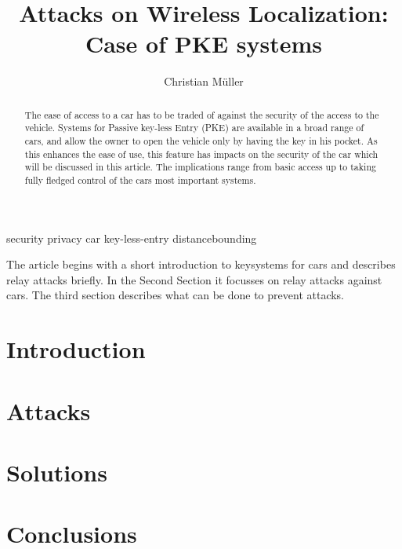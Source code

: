 \documentclass[a4paper]{IEEEtran}
\title{Attacks on Wireless Localization:\\Case of PKE systems}
\author{Christian Müller}
\begin{document}
\maketitle
\begin{IEEEkeywords}
security privacy car key-less-entry distancebounding
\end{IEEEkeywords}


\begin{abstract}
The ease of access to a car has to be traded of against the security of the
access to the vehicle.
Systems for Passive key-less Entry (PKE) are available in a broad range of cars,
and allow the owner to open the vehicle only by having the key in his pocket.
As this enhances the ease of use, this feature has impacts on the security of
the car which will be discussed in this article. The implications range from 
basic access up to taking fully fledged control of the cars most important
systems.
\end{abstract}

The article begins with a short introduction to keysystems for cars and
describes relay attacks briefly.
In the Second Section it focusses on relay attacks against cars.
The third section describes what can be done to prevent attacks.

\section{Introduction}
	

\section{Attacks}
	

\section{Solutions}
	


\section{Conclusions}
	

\newpage
\nocite{*}


\end{document}
